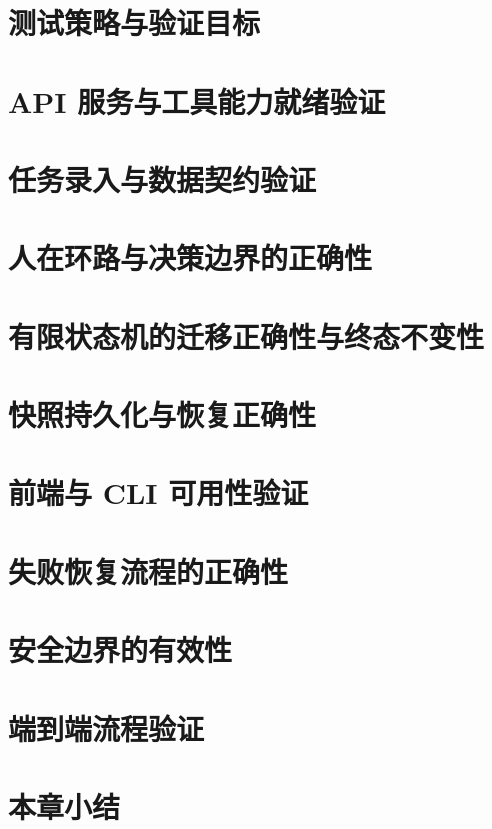 
\section{测试策略与验证目标}


\section{API 服务与工具能力就绪验证}


\section{任务录入与数据契约验证}


\section{人在环路与决策边界的正确性}


\section{有限状态机的迁移正确性与终态不变性}


\section{快照持久化与恢复正确性}


\section{前端与 CLI 可用性验证}


\section{失败恢复流程的正确性}


\section{安全边界的有效性}


\section{端到端流程验证}


\section{本章小结}

